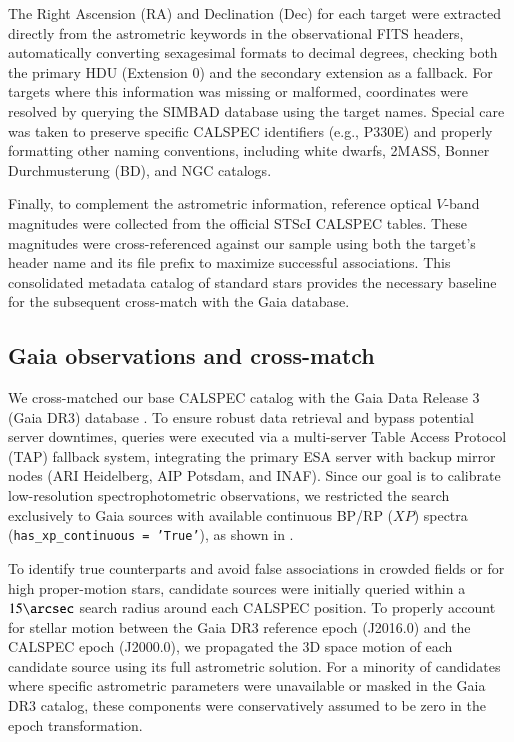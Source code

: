 \documentclass{aa}
\begin{document}
The Right Ascension (RA) and Declination (Dec) for each target were extracted directly from the astrometric keywords in the observational FITS headers, automatically converting sexagesimal formats to decimal degrees, checking both the primary HDU (Extension 0) and the secondary extension as a fallback. For targets where this information was missing or malformed, coordinates were resolved by querying the SIMBAD database using the target names. Special care was taken to preserve specific CALSPEC identifiers (e.g., P330E) and properly formatting other naming conventions, including white dwarfs, 2MASS, Bonner Durchmusterung (BD), and NGC catalogs.

Finally, to complement the astrometric information, reference optical $V$-band magnitudes were collected from the official STScI CALSPEC tables. These magnitudes were cross-referenced against our sample using both the target's header name and its file prefix to maximize successful associations. This consolidated metadata catalog of standard stars provides the necessary baseline for the subsequent cross-match with the Gaia database.


\subsection{Gaia observations and cross-match}

We cross-matched our base CALSPEC catalog with the Gaia Data Release 3 (Gaia DR3) database \citep{gaia_dr3_2023}. To ensure robust data retrieval and bypass potential server downtimes, queries were executed via a multi-server Table Access Protocol (TAP) fallback system, integrating the primary ESA server with backup mirror nodes (ARI Heidelberg, AIP Potsdam, and INAF). Since our goal is to calibrate low-resolution spectrophotometric observations, we restricted the search exclusively to Gaia sources with available continuous BP/RP ($XP$) spectra (\texttt{has\_xp\_continuous = 'True'}), as shown in \cite{de_angeli_2023}. 

To identify true counterparts and avoid false associations in crowded fields or for high proper-motion stars, candidate sources were initially queried within a $15\arcsec$ search radius around each CALSPEC position. To properly account for stellar motion between the Gaia DR3 reference epoch (J2016.0) and the CALSPEC epoch (J2000.0), we propagated the 3D space motion of each candidate source using its full astrometric solution. For a minority of candidates where specific astrometric parameters were unavailable or masked in the Gaia DR3 catalog, these components were conservatively assumed to be zero in the epoch transformation.
\end{document}
